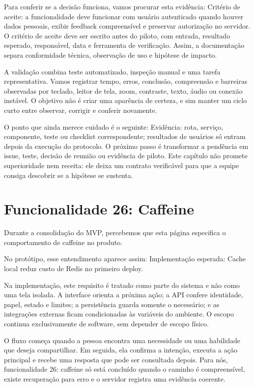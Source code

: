 \documentclass[12pt,oneside,a4paper,article]{abntex2}
\begin{document}
Para conferir se a decisão funciona, vamos procurar esta evidência: Critério de aceite: a funcionalidade deve funcionar com usuário autenticado quando houver dados pessoais, exibir feedback compreensível e preservar autorização no servidor. O critério de aceite deve ser escrito antes do piloto, com entrada, resultado esperado, responsável, data e ferramenta de verificação. Assim, a documentação separa conformidade técnica, observação de uso e hipótese de impacto.

A validação combina teste automatizado, inspeção manual e uma tarefa representativa. Vamos registrar tempo, erros, conclusão, compreensão e barreiras observadas por teclado, leitor de tela, zoom, contraste, texto, áudio ou conexão instável. O objetivo não é criar uma aparência de certeza, e sim manter um ciclo curto entre observar, corrigir e conferir novamente.

O ponto que ainda merece cuidado é o seguinte: Evidência: rota, serviço, componente, teste ou checklist correspondente; resultados de usuários só entram depois da execução do protocolo. O próximo passo é transformar a pendência em issue, teste, decisão de reunião ou evidência de piloto. Este capítulo não promete superioridade nem receita: ele deixa um contrato verificável para que a equipe consiga descobrir se a hipótese se sustenta.

\section{Funcionalidade 26: Caffeine}
Durante a consolidação do MVP, percebemos que esta página especifica o comportamento de caffeine no produto.

No protótipo, esse entendimento aparece assim: Implementação esperada: Cache local reduz custo de Redis no primeiro deploy.

Na implementação, este requisito é tratado como parte do sistema e não como uma tela isolada. A interface orienta a próxima ação; a API confere identidade, papel, estado e limites; a persistência guarda somente o necessário; e as integrações externas ficam condicionadas às variáveis do ambiente. O escopo continua exclusivamente de software, sem depender de escopo físico.

O fluxo começa quando a pessoa encontra uma necessidade ou uma habilidade que deseja compartilhar. Em seguida, ela confirma a intenção, executa a ação principal e recebe uma resposta que pode ser consultada depois. Para nós, funcionalidade 26: caffeine só está concluído quando o caminho é compreensível, existe recuperação para erro e o servidor registra uma evidência coerente.
\end{document}
